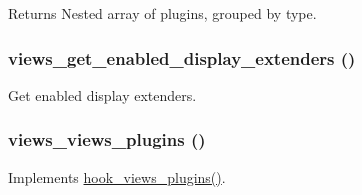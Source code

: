 \begin{DoxyReturn}{Returns}
Nested array of plugins, grouped by type. 
\end{DoxyReturn}
\hypertarget{views_2includes_2plugins_8inc_a6ffdbd1645ea104a3e95303c05bde2f2}{
\subsubsection[{views\_\-get\_\-enabled\_\-display\_\-extenders}]{\setlength{\rightskip}{0pt plus 5cm}views\_\-get\_\-enabled\_\-display\_\-extenders ()}}
\label{views_2includes_2plugins_8inc_a6ffdbd1645ea104a3e95303c05bde2f2}
Get enabled display extenders. \hypertarget{views_2includes_2plugins_8inc_a89b4d3bd8e15dca9a33e85b203218b8d}{
\subsubsection[{views\_\-views\_\-plugins}]{\setlength{\rightskip}{0pt plus 5cm}views\_\-views\_\-plugins ()}}
\label{views_2includes_2plugins_8inc_a89b4d3bd8e15dca9a33e85b203218b8d}
Implements \hyperlink{group__views__hooks_ga23f6e9972b2ed84fc54b7ff63f44477d}{hook\_\-views\_\-plugins()}. 